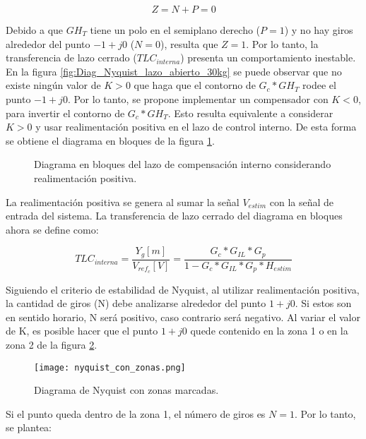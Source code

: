 \begin{equation}\label{eq_condicion_Nyquist}
	Z=N+P=0
\end{equation}


Debido a que $GH_T$ tiene un polo en el semiplano derecho ($P=1$) y no hay giros alrededor del punto $-1+j0$ ($N=0$), resulta que $Z=1$. Por lo tanto, la transferencia de lazo cerrado ($TLC_{interna}$) presenta un comportamiento inestable. En la figura \ref{fig:Diag_Nyquist_lazo_abierto_30kg} se puede observar que no existe ningún valor de $K>0$ que haga que el contorno de $G_c*GH_T$ rodee el punto $-1+j0$. Por lo tanto, se propone implementar un compensador con $K<0$, para invertir el contorno de $G_c*GH_T$. Esto resulta equivalente a considerar $K>0$ y usar realimentación positiva en el lazo de control interno. De esta forma se obtiene el diagrama en bloques de la figura \ref{fig:diag-interno_realimentacion_positiva}.


\begin{figure}[H]
	\centering
	
	\caption{Diagrama en bloques del lazo de compensación interno considerando realimentación positiva.}	\label{fig:diag-interno_realimentacion_positiva}
\end{figure}


La realimentación positiva se genera al sumar la señal $V_{estim}$ con la señal de entrada del sistema. La transferencia de lazo cerrado del diagrama en bloques ahora se define como:

\begin{equation}
	TLC_{interna}=\frac{Y_g[m]}{V_{ref_c}[V]}=\frac{G_c*G_{IL}*G_p}{1-G_c*G_{IL}*G_p*H_{estim}}
\end{equation}

Siguiendo el criterio de estabilidad de Nyquist, al utilizar realimentación positiva, la cantidad de giros (N) debe analizarse alrededor del punto $1+j0$. Si estos son en sentido horario, N será positivo, caso contrario será negativo. Al variar el valor de K, es posible hacer que el punto $1+j0$ quede contenido en la zona 1 o en la zona 2 de la figura \ref{fig:nyquist-con-zonas}. 

\begin{figure}[H]
	\centering
	\texttt{[image: nyquist\_con\_zonas.png]}
	\caption{Diagrama de Nyquist con zonas marcadas.}	
	\label{fig:nyquist-con-zonas}
\end{figure}

Si el punto queda dentro de la zona 1, el número de giros es $N=1$. Por lo tanto, se plantea:


